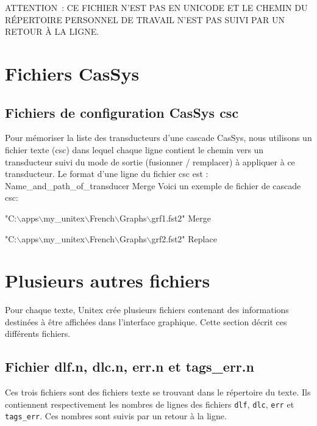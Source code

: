 \bigskip
\noindent ATTENTION~: CE FICHIER N’EST PAS EN UNICODE ET LE CHEMIN DU
RÉPERTOIRE PERSONNEL DE TRAVAIL
N’EST PAS SUIVI PAR UN RETOUR À LA LIGNE.


\section{Fichiers CasSys}

\subsection{Fichiers de  configuration CasSys csc}

Pour mémoriser la liste des transducteurs d'une cascade CasSys, nous utilisons un fichier texte
(csc) dans lequel chaque ligne contient le chemin vers un transducteur suivi du mode de sortie
(fusionner / remplacer) à appliquer à ce transducteur.
Le format d'une ligne du fichier csc est : Name\_and\_path\_of\_transducer  Merge
Voici un exemple de fichier de cascade csc:

\ttfamily
"C:$\backslash$apps$\backslash$my\_unitex$\backslash$French$\backslash$Graphs$\backslash$grf1.fst2" Merge

"C:$\backslash$apps$\backslash$my\_unitex$\backslash$French$\backslash$Graphs$\backslash$grf2.fst2" Replace
\rmfamily

\section{Plusieurs autres fichiers}
Pour chaque texte, Unitex crée plusieurs fichiers contenant des informations destinées à être
affichées dans l’interface graphique. Cette section décrit ces différents fichiers.



\subsection{Fichier dlf.n, dlc.n, err.n et tags\_err.n}
Ces trois fichiers sont des fichiers texte se trouvant dans le répertoire du texte. Ils contiennent
respectivement les nombres de lignes des fichiers \verb+dlf+, \verb+dlc+, \verb+err+ et
\verb+tags_err+. Ces nombres sont suivis par un retour à la ligne.



